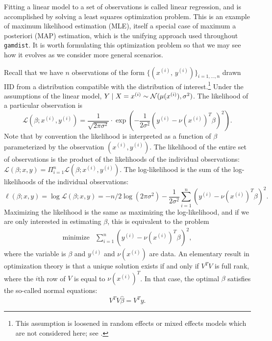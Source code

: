 \documentclass[12pt]{article}
\newcommand{\gamdist}{\texttt{gamdist}}
\begin{document}
Fitting a linear model to a set of observations is called linear regression, and is accomplished by solving a least squares optimization problem. This is an example of maximum likelihood estimation (MLE), itself a special case of maximum a posteriori (MAP) estimation, which is the unifying approach used throughout \gamdist{}. It is worth formulating this optimization problem so that we may see how it evolves as we consider more general scenarios.

Recall that we have $n$ observations of the form $\{ (x^{(i)}, \,y^{(i)} ) \}_{i=1, \ldots, n}$ drawn IID from a distribution compatible with the distribution of interest.\footnote{This assumption is loosened in random effects or mixed effects models which are not considered here; see \cite{Stroup:2012}.} Under the assumptions of the linear model, $Y \; | \; X = x^{(i)} \sim {\mathcal N} (\mu(x^{(i)}), \sigma^2)$. The likelihood of a particular observation is
\begin{displaymath}
    \mathcal{L}(\beta; x^{(i)}, y^{(i)}) = \frac{1}{\sqrt{2\pi \sigma^2}} \cdot \exp\left( -\frac{1}{2 \sigma^2} \left(y^{(i)} - \nu \left( x^{(i)} \right)^T \beta \right)^2 \right).
\end{displaymath}
Note that by convention the likelihood is interpreted as a function of $\beta$ parameterized by the observation $(x^{(i)}, y^{(i)})$. The likelihood of the entire set of observations is the product of the likelihoods of the individual observations: $\mathcal{L}(\beta; x, y) = \Pi_{i=1}^n \mathcal{L}(\beta; x^{(i)}, y^{(i)})$. The log-likelihood is the sum of the log-likelihoods of the individual observations:
\begin{displaymath}
   \ell(\beta; x, y) = \log \mathcal{L}(\beta; x, y) = -n/2 \log(2\pi \sigma^2) - \frac{1}{2\sigma^2} \sum_{i=1}^n \left( y^{(i)} - \nu \left(x^{(i)} \right)^T \beta \right)^2.
\end{displaymath}
Maximizing the likelihood is the same as maximizing the log-likelihood, and if we are only interested in estimating $\beta$, this is equivalent to the problem
\begin{displaymath}
        \begin{array}{ll}
            \mbox{minimize} & {\displaystyle \sum_{i=1}^n} \left( y^{(i)} - \nu \left(x^{(i)} \right)^T \beta \right)^2,
        \end{array}
\end{displaymath}
where the variable is $\beta$ and $y^{(i)}$ and $\nu(x^{(i)})$ are data. An elementary result in optimization theory is that a unique solution exists if and only if $V^T V$ is full rank, where the $i$th row of $V$ is equal to $\nu(x^{(i)})^T$. In that case, the optimal $\beta$ satisfies the so-called normal equations:
\begin{displaymath}
    V^T V \hat{\beta} = V^T  y.
\end{displaymath}
\end{document}
